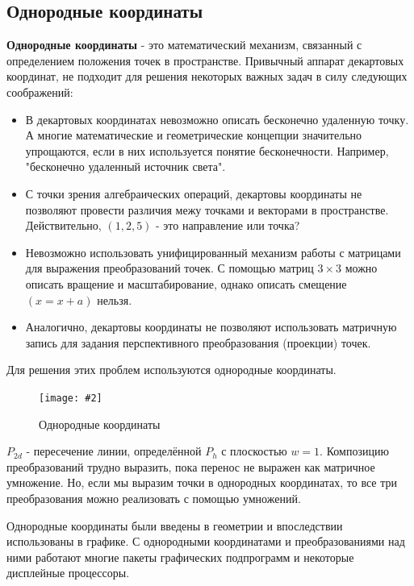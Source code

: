 \documentclass[a4paper, 14pt]{extarticle}
\newcommand{\screenshot}[3]{
	\begin{figure}[h]
		\centering
		\texttt{[image: \#2]}
		\caption{#3}
	\end{figure}
}
\begin{document}
\subsection{Однородные координаты}
\textbf{Однородные координаты} - это математический механизм, связанный с определением положения точек в пространстве. Привычный аппарат декартовых координат, не подходит для решения некоторых важных задач в силу следующих соображений:
\begin{itemize}
	\item В декартовых координатах невозможно описать бесконечно удаленную точку. А многие математические и геометрические концепции значительно упрощаются, если в них используется понятие бесконечности. Например, "бесконечно удаленный источник света".
	\item С точки зрения алгебраических операций, декартовы координаты не позволяют провести различия межу точками и векторами в пространстве. Действительно, $(1,2,5)$ - это направление или точка?
	\item Невозможно использовать унифицированный механизм работы с матрицами для выражения преобразований точек. С помощью матриц $3 \times 3$ можно описать вращение и масштабирование, однако описать смещение $(x=x+a)$ нельзя.
	\item Аналогично, декартовы координаты не позволяют использовать матричную запись для задания перспективного преобразования (проекции) точек.
\end{itemize}
Для решения этих проблем используются однородные координаты.

\screenshot{width=9cm}{l3/S009.jpg}{Однородные координаты}
$P_{2d}$ - пересечение линии, определённой $P_h$ с плоскостью $w=1$.
Композицию преобразований трудно выразить, пока перенос не выражен как матричное умножение. Но, если мы выразим точки в однородных координатах, то все три преобразования можно реализовать с помощью умножений.

Однородные координаты были введены в геометрии и впоследствии использованы в графике. С однородными координатами и преобразованиями над ними работают многие пакеты графических подпрограмм и некоторые дисплейные процессоры.
\end{document}
